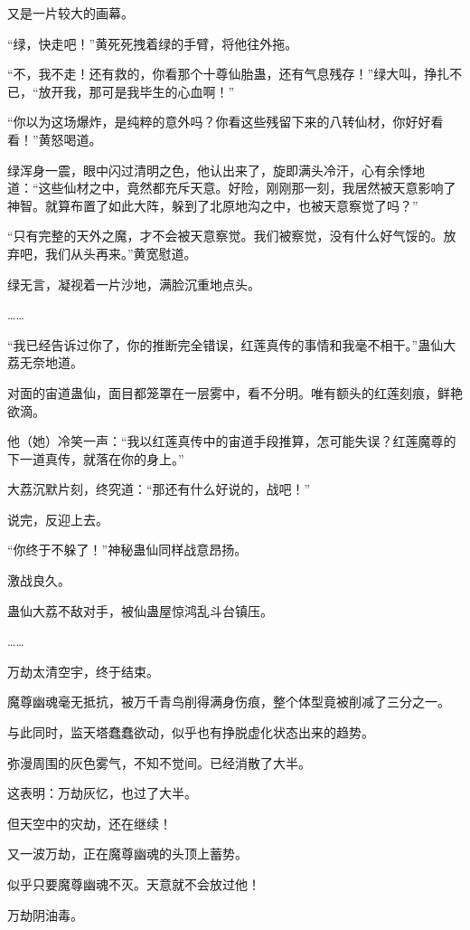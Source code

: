 
\begin{this_body}

又是一片较大的画幕。

“绿，快走吧！”黄死死拽着绿的手臂，将他往外拖。

“不，我不走！还有救的，你看那个十尊仙胎蛊，还有气息残存！”绿大叫，挣扎不已，“放开我，那可是我毕生的心血啊！”

“你以为这场爆炸，是纯粹的意外吗？你看这些残留下来的八转仙材，你好好看看！”黄怒喝道。

绿浑身一震，眼中闪过清明之色，他认出来了，旋即满头冷汗，心有余悸地道：“这些仙材之中，竟然都充斥天意。好险，刚刚那一刻，我居然被天意影响了神智。就算布置了如此大阵，躲到了北原地沟之中，也被天意察觉了吗？”

“只有完整的天外之魔，才不会被天意察觉。我们被察觉，没有什么好气馁的。放弃吧，我们从头再来。”黄宽慰道。

绿无言，凝视着一片沙地，满脸沉重地点头。

……

“我已经告诉过你了，你的推断完全错误，红莲真传的事情和我毫不相干。”蛊仙大荔无奈地道。

对面的宙道蛊仙，面目都笼罩在一层雾中，看不分明。唯有额头的红莲刻痕，鲜艳欲滴。

他（她）冷笑一声：“我以红莲真传中的宙道手段推算，怎可能失误？红莲魔尊的下一道真传，就落在你的身上。”

大荔沉默片刻，终究道：“那还有什么好说的，战吧！”

说完，反迎上去。

“你终于不躲了！”神秘蛊仙同样战意昂扬。

激战良久。

蛊仙大荔不敌对手，被仙蛊屋惊鸿乱斗台镇压。

……

万劫太清空宇，终于结束。

魔尊幽魂毫无抵抗，被万千青鸟削得满身伤痕，整个体型竟被削减了三分之一。

与此同时，监天塔蠢蠢欲动，似乎也有挣脱虚化状态出来的趋势。

弥漫周围的灰色雾气，不知不觉间。已经消散了大半。

这表明：万劫灰忆，也过了大半。

但天空中的灾劫，还在继续！

又一波万劫，正在魔尊幽魂的头顶上蓄势。

似乎只要魔尊幽魂不灭。天意就不会放过他！

万劫阴油毒。


\end{this_body}

